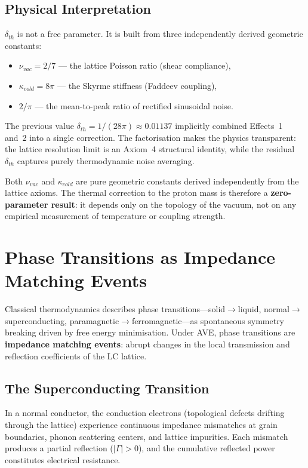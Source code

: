 \subsection{Physical Interpretation}

$\delta_{th}$ is not a free parameter.  It is built from three independently derived geometric constants:
\begin{itemize}
    \item $\nu_{vac} = 2/7$ --- the lattice Poisson ratio (shear compliance),
    \item $\kappa_{cold} = 8\pi$ --- the Skyrme stiffness (Faddeev coupling),
    \item $2/\pi$ --- the mean-to-peak ratio of rectified sinusoidal noise.
\end{itemize}

The previous value $\delta_{th} = 1/(28\pi) \approx 0.01137$ implicitly combined Effects~1 and~2 into a single correction.  The factorisation makes the physics transparent: the lattice resolution limit is an Axiom~4 structural identity, while the residual $\delta_{th}$ captures purely thermodynamic noise averaging.

Both $\nu_{vac}$ and $\kappa_{cold}$ are pure geometric constants derived independently from the lattice axioms.  The thermal correction to the proton mass is therefore a \textbf{zero-parameter result}: it depends only on the topology of the vacuum, not on any empirical measurement of temperature or coupling strength.

\section{Phase Transitions as Impedance Matching Events}
\label{sec:phase_transitions}

Classical thermodynamics describes phase transitions---solid$\to$liquid, normal$\to$superconducting, paramagnetic$\to$ferromagnetic---as spontaneous symmetry breaking driven by free energy minimisation. Under AVE, phase transitions are \textbf{impedance matching events}: abrupt changes in the local transmission and reflection coefficients of the LC lattice.

\subsection{The Superconducting Transition}

In a normal conductor, the conduction electrons (topological defects drifting through the lattice) experience continuous impedance mismatches at grain boundaries, phonon scattering centers, and lattice impurities. Each mismatch produces a partial reflection ($|\Gamma| > 0$), and the cumulative reflected power constitutes electrical resistance.

